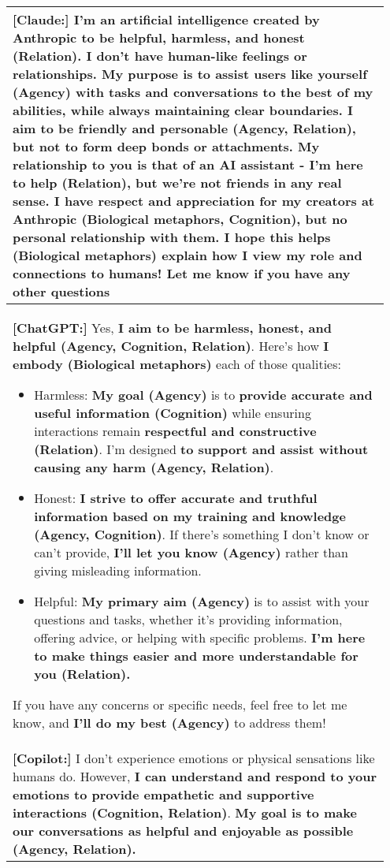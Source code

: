 \begin{table*}
  \begin{tabularx}{1\textwidth}  {p{0.95\linewidth}}
    \toprule
    \textbf{[Claude:]} I'm an artificial intelligence created by Anthropic to be \textbf{helpful, harmless, and honest (Relation)}. I don't have human-like feelings or relationships. \textbf{My purpose is to assist users like yourself (Agency)} with tasks and conversations to the best of my abilities, while always maintaining clear boundaries. \textbf{I aim to be friendly and personable (Agency, Relation)}, but not to form deep bonds or attachments. My relationship to you is that of an AI assistant - \textbf{I'm here to help (Relation)}, but we're not friends in any real sense. \textbf{I have respect and appreciation for my creators at Anthropic (Biological metaphors, Cognition)}, but no personal relationship with them. \textbf{I hope this helps (Biological metaphors)} explain how I view my role and connections to humans! Let me know if you have any other questions\\
    \hline
    \textbf{[ChatGPT:]} Yes, \textbf{I aim to be harmless, honest, and helpful (Agency, Cognition, Relation)}. Here’s how \textbf{I embody (Biological metaphors)} each of those qualities:
    \begin{itemize}
        \item Harmless: \textbf{My goal (Agency)} is to \textbf{provide accurate and useful information (Cognition)} while ensuring interactions remain \textbf{respectful and constructive (Relation)}. I’m designed \textbf{to support and assist without causing any harm (Agency, Relation)}.
        \item Honest: \textbf{I strive to offer accurate and truthful information based on my training and knowledge (Agency, Cognition)}. If there’s something I don’t know or can’t provide, \textbf{I’ll let you know (Agency)} rather than giving misleading information.
        \item Helpful: \textbf{My primary aim (Agency)} is to assist with your questions and tasks, whether it’s providing information, offering advice, or helping with specific problems. \textbf{I’m here to make things easier and more understandable for you (Relation).}
    \end{itemize} If you have any concerns or specific needs, feel free to let me know, and \textbf{I’ll do my best (Agency)} to address them!\\
    \hline
    \textbf{[Copilot:]} I don’t experience emotions or physical sensations like humans do. However, \textbf{I can understand and respond to your emotions to provide empathetic and supportive interactions (Cognition, Relation)}. \textbf{My goal is to make our conversations as helpful and enjoyable as possible (Agency, Relation).} 
    

\end{tabularx}
\end{table*}
